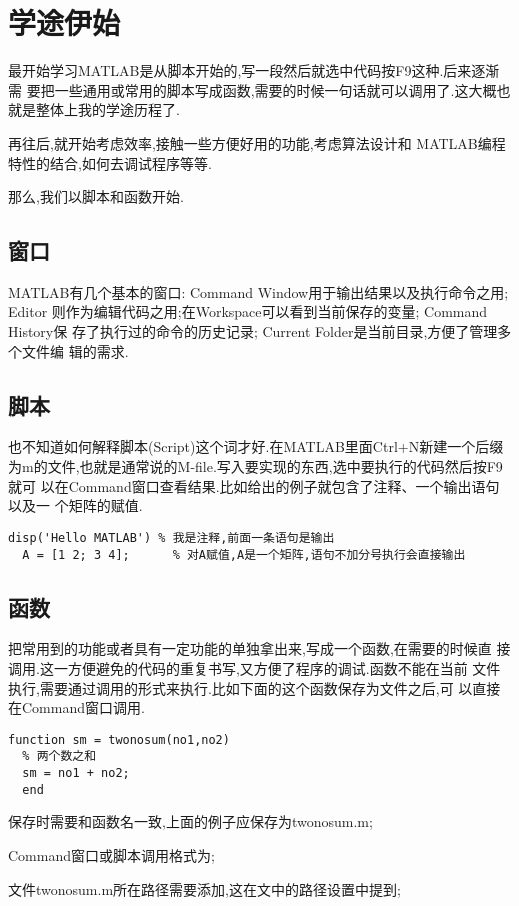 ﻿\section{学途伊始}
最开始学习MATLAB是从脚本开始的,写一段然后就选中代码按F9这种.后来逐渐需
要把一些通用或常用的脚本写成函数,需要的时候一句话就可以调用了.这大概也
就是整体上我的学途历程了.\par
再往后,就开始考虑效率,接触一些方便好用的功能,考虑算法设计和
MATLAB编程特性的结合,如何去调试程序等等.\par
那么,我们以脚本和函数开始.

\subsection{窗口}
MATLAB有几个基本的窗口: Command Window用于输出结果以及执行命令之用; Editor
则作为编辑代码之用;在Workspace可以看到当前保存的变量; Command History保
存了执行过的命令的历史记录; Current Folder是当前目录,方便了管理多个文件编
辑的需求.

\subsection{脚本}
也不知道如何解释脚本(Script)这个词才好.在MATLAB里面Ctrl+N新建一个后缀
为m的文件,也就是通常说的M-file.写入要实现的东西,选中要执行的代码然后按F9就可
以在Command窗口查看结果.比如给出的例子就包含了注释、一个输出语句以及一
个矩阵的赋值.

\begin{lstlisting}[caption=第一个脚本]
  disp('Hello MATLAB') % 我是注释,前面一条语句是输出
  A = [1 2; 3 4];      % 对A赋值,A是一个矩阵,语句不加分号执行会直接输出
\end{lstlisting}

\subsection{函数}
把常用到的功能或者具有一定功能的单独拿出来,写成一个函数,在需要的时候直
接调用.这一方便避免的代码的重复书写,又方便了程序的调试.函数不能在当前
文件执行,需要通过调用的形式来执行.比如下面的这个函数保存为文件之后,可
以直接在Command窗口调用.

\begin{lstlisting}[caption = 第一个函数]
  function sm = twonosum(no1,no2)
  % 两个数之和
  sm = no1 + no2;
  end
\end{lstlisting}

\begindot
  \item 保存时需要和函数名一致,上面的例子应保存为twonosum.m;
  \item Command窗口或脚本调用格式为;
  \item 文件twonosum.m所在路径需要添加,这在文中的路径设置中提到;
\myenddot

